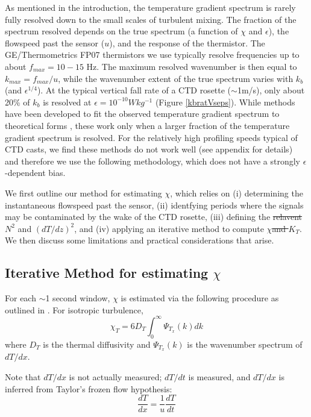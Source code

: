 \documentclass{ametsoc}
\providecommand{\DIFadd}[1]{{\protect\color{blue}\uwave{#1}}} %
\providecommand{\DIFdel}[1]{{\protect\color{red}\sout{#1}}}                      %
\providecommand{\DIFaddbegin}{} %
\providecommand{\DIFaddend}{} %
\providecommand{\DIFdelbegin}{} %
\providecommand{\DIFdelend}{} %
\begin{document}
As mentioned in the introduction, the temperature gradient spectrum is rarely fully resolved down to the small scales of turbulent mixing. The fraction of the spectrum resolved depends on the true spectrum (a function of $\chi$ and $\epsilon$), the flowspeed past the sensor ($u$), and the response of the thermistor. The GE/Thermometrics FP07 thermistors we use typically resolve frequencies up to about $f_{max}=10-15$ Hz. The maximum resolved wavenumber is then equal to $k_{max}=f_{max}/u$, while the wavenumber extent of the true spectrum varies with $k_b$ (and $\epsilon^{1/4}$). At the typical vertical fall rate of a CTD rosette ($\sim$1m/s), only about 20\% of $k_b$ is resolved at $\epsilon=10^{-10}Wkg^{-1}$ (Figure \ref{kbratVseps}). While methods have been developed to fit the observed temperature gradient spectrum to theoretical forms \citep{ruddicketal00}, these work only when a larger fraction of the temperature gradient spectrum is resolved. For the relatively high profiling speeds typical of CTD casts, we find these methods do not work well (see appendix for details) and therefore we use the following methodology, which does not have a strongly $\epsilon$-dependent bias.

We first outline our method for estimating $\chi$, which relies on (i) determining the instantaneous flowspeed past the sensor, (ii) identfying periods where the signals may be contaminated by the wake of the CTD rosette, (iii) defining the \DIFdelbegin \DIFdel{relavent }\DIFdelend \DIFaddbegin \DIFadd{relevant values of }\DIFaddend $N^2$ and $(dT/dz)^2$, and (iv) applying an iterative method to compute $\chi$\DIFdelbegin \DIFdel{and $K_T$}\DIFdelend . We then discuss some limitations and practical considerations that arise.

\subsection{Iterative Method for estimating $\chi$}

For each $\sim$1 second window, $\chi$ is estimated via the following procedure as outlined in \cite{moumnash09}. For isotropic turbulence,
\begin{equation}
\chi_T=6D_T \int_{0}^{\infty}\Psi_{T_x} (k) dk
\label{eq:chiint}
\end{equation}
where $D_T$ is the thermal diffusivity and $\Psi_{T_x} (k)$ is the wavenumber spectrum of $dT/dx$.

Note that $dT/dx$ is not actually measured; $dT/dt$ is measured, and $dT/dx$ is inferred from Taylor's frozen flow hypothesis:
 \begin{equation}
\frac{dT}{dx}=\frac{1}{u}\frac{dT}{dt}
\label{eq:2}
\end{equation}
\DIFdelbegin %
\end{document}
